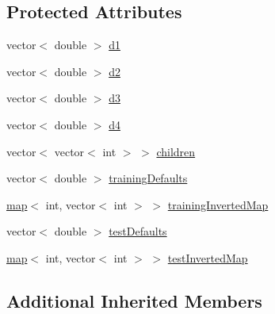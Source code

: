 \subsection*{Protected Attributes}
\begin{DoxyCompactItemize}
\item 
vector$<$ double $>$ \hyperlink{classcv_1_1of2_1_1FabMap2_af4a5e362934e52c9e8e175994155a3cb}{d1}
\item 
vector$<$ double $>$ \hyperlink{classcv_1_1of2_1_1FabMap2_a8489e72b64325d3cf54f6c9df7c76b57}{d2}
\item 
vector$<$ double $>$ \hyperlink{classcv_1_1of2_1_1FabMap2_ae7a78b4ab2be95a3089e0096722835c3}{d3}
\item 
vector$<$ double $>$ \hyperlink{classcv_1_1of2_1_1FabMap2_a52716d68ae40a8b3fe34bb724944dafb}{d4}
\item 
vector$<$ vector$<$ int $>$ $>$ \hyperlink{classcv_1_1of2_1_1FabMap2_a2d0a980ccb6950b3d2a3990be0891e54}{children}
\item 
vector$<$ double $>$ \hyperlink{classcv_1_1of2_1_1FabMap2_a175dafd92c4662e582c6f71d2f6bed77}{training\-Defaults}
\item 
\hyperlink{core__c_8h_a035af1d430a8c9a1d115cbfb6c8e25dc}{map}$<$ int, vector$<$ int $>$ $>$ \hyperlink{classcv_1_1of2_1_1FabMap2_a4c1f0ec8cd750efb89dfc6209ce4d69f}{training\-Inverted\-Map}
\item 
vector$<$ double $>$ \hyperlink{classcv_1_1of2_1_1FabMap2_a813759f4e63ec1f709c086fcc244e74f}{test\-Defaults}
\item 
\hyperlink{core__c_8h_a035af1d430a8c9a1d115cbfb6c8e25dc}{map}$<$ int, vector$<$ int $>$ $>$ \hyperlink{classcv_1_1of2_1_1FabMap2_a56985081bf7c3e7998ace4ef2e721f80}{test\-Inverted\-Map}
\end{DoxyCompactItemize}
\subsection*{Additional Inherited Members}


